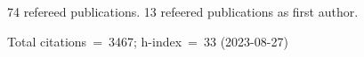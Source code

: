 74 refereed publications. 13 refeered publications as first author.

Total citations~=~3467; h-index~=~33 (2023-08-27)